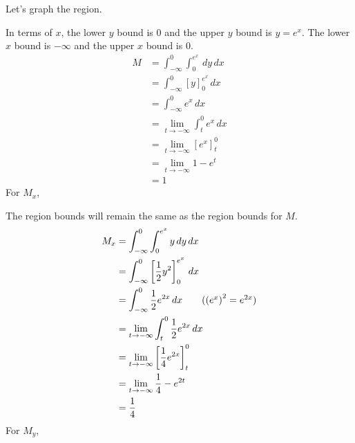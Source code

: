 \documentclass{article}
\newcommand{\lrp}[1]{\left( #1 \right)}
\newcommand{\lrb}[1]{\left[ #1 \right]}
\begin{document}
Let's graph the region.
\begin{center}
\end{center}
In terms of $x$, the lower $y$ bound is $0$ and the upper $y$ bound is $y=e^x$. The lower $x$ bound is $-\infty$ and the upper $x$ bound is $0$.
\begin{align*}
  M&=\int_{-\infty}^0\int_0^{e^x}\,dy\,dx\\
  &=\int_{-\infty}^0 \lrb{y}_0^{e^x}\,dx\\
  &=\int_{-\infty}^0 e^x\,dx\\
  &=\lim_{t\to-\infty}\int_{t}^0 e^x\,dx\\
  &=\lim_{t\to-\infty}\lrb{e^x}_t^0\\
  &=\lim_{t\to-\infty} 1-e^t\\
  &=1
\end{align*}
For $M_x$,

The region bounds will remain the same as the region bounds for $M$.
\begin{align*}
    M_x&=\int_{-\infty}^0\int_0^{e^x} y\,dy\,dx\\
    &=\int_{-\infty}^0 \lrb{\frac{1}{2}y^2}_0^{e^x}\,dx\\
    &=\int_{-\infty}^0 \frac{1}{2}e^{2x}\,dx\tag{$\lrp{e^x}^2=e^{2x}$}\\
    &=\lim_{t\to-\infty}\int_{t}^0 \frac{1}{2}e^{2x}\,dx\\
    &=\lim_{t\to-\infty}\lrb{\frac{1}{4}e^{2x}}_t^0\\
    &=\lim_{t\to-\infty} \frac{1}{4} - e^{2t}\\
    &=\frac{1}{4}
\end{align*}
For $M_y$,
\end{document}
